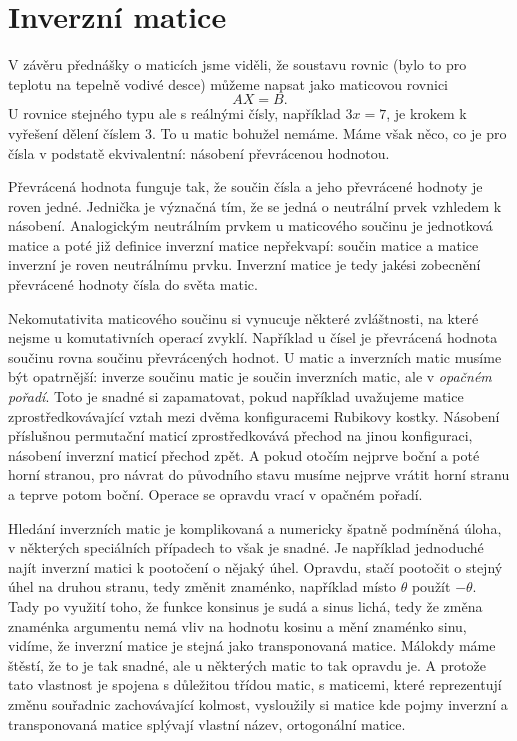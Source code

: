 \documentclass[12pt]{article}
\begin{document}
\section*{Inverzní matice}

V závěru přednášky o maticích jsme viděli, že soustavu rovnic (bylo to pro teplotu na tepelně vodivé desce) můžeme napsat jako maticovou rovnici $$AX=B.$$
U rovnice stejného typu ale s reálnými čísly, například $3x=7$, je krokem k vyřešení dělení číslem $3$. To u matic bohužel nemáme. Máme však něco, co je pro čísla v podstatě ekvivalentní: násobení převrácenou hodnotou.

Převrácená hodnota funguje tak, že součin čísla a jeho převrácené hodnoty je roven jedné. Jednička je význačná tím, že se jedná o neutrální prvek vzhledem k násobení. Analogickým neutrálním prvkem u maticového součinu je jednotková matice a poté již definice inverzní matice nepřekvapí: součin matice a matice inverzní je roven neutrálnímu prvku. Inverzní matice je tedy jakési zobecnění převrácené hodnoty čísla do světa matic. 

Nekomutativita maticového součinu si vynucuje některé zvláštnosti, na které nejsme u komutativních operací zvyklí. Například u čísel je převrácená hodnota součinu rovna součinu převrácených hodnot. U matic a inverzních matic musíme být opatrnější:  inverze součinu matic je součin inverzních matic, ale v \textit{opačném pořadí}. Toto je snadné si zapamatovat, pokud například uvažujeme matice zprostředkovávající vztah mezi dvěma konfiguracemi Rubikovy kostky. Násobení příslušnou permutační maticí zprostředkovává přechod na jinou konfiguraci, násobení inverzní maticí přechod zpět. A pokud otočím nejprve boční a poté horní stranou, pro návrat do původního stavu musíme nejprve vrátit horní stranu a teprve potom boční. Operace se opravdu vrací v opačném pořadí.

Hledání inverzních matic je komplikovaná a numericky špatně podmíněná úloha, v některých speciálních případech to však je snadné. Je například jednoduché najít inverzní matici k pootočení o nějaký úhel. Opravdu, stačí pootočit o stejný úhel na druhou stranu, tedy změnit znaménko, například místo $\theta$ použít $-\theta$. Tady po využití toho, že funkce konsinus je sudá a sinus lichá, tedy že změna znaménka argumentu nemá vliv na hodnotu kosinu a mění znaménko sinu, vidíme, že inverzní matice je stejná jako transponovaná matice. Málokdy máme štěstí, že to je tak snadné, ale u některých matic to tak opravdu je. A protože tato vlastnost je spojena s důležitou třídou matic, s maticemi, které reprezentují změnu souřadnic zachovávající kolmost, vysloužily si matice kde pojmy inverzní a transponovaná matice splývají vlastní název, ortogonální matice.
\end{document}
